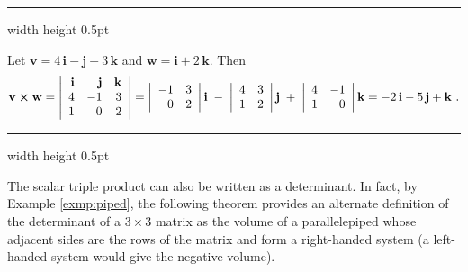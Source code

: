 \smallskip
\hrule width \textwidth height 0.5pt
\begin{exmp}
 Let $\mathbf{v} = 4\,\mathbf{i} - \mathbf{j} + 3\,\mathbf{k}$ and $\mathbf{w} = \mathbf{i} + 2\,\mathbf{k}$. Then
 \begin{displaymath}
  \mathbf{v} \bm{\times} \mathbf{w} =
  \left|
  \begin{array}{rrr}
   \mathbf{i} & \mathbf{j} & \mathbf{k}\\
   4 & -1 & 3\\
   1 & 0 & 2
  \end{array}\right|
  = \left|\begin{array}{rr} -1 & 3 \\ 0 & 2 \end{array}\right| \mathbf{i} \;-\;
  \left|\begin{array}{rr} 4 & 3 \\ 1 & 2 \end{array}\right| \mathbf{j} \;+\;
  \left|\begin{array}{rr} 4 & -1 \\ 1 & 0 \end{array}\right| \mathbf{k}
  = -2\,\mathbf{i} - 5\,\mathbf{j} + \mathbf{k} ~.
 \end{displaymath}
\end{exmp}
\hrule width \textwidth height 0.5pt
\smallskip

The scalar triple product can also be written as a determinant. In fact, by Example \ref{exmp:piped}, the following
theorem provides an alternate definition of the determinant of a $3 \times 3$ matrix as the volume
of a parallelepiped whose adjacent sides are the rows of the matrix and form a right-handed system (a
left-handed system would give the negative volume).


